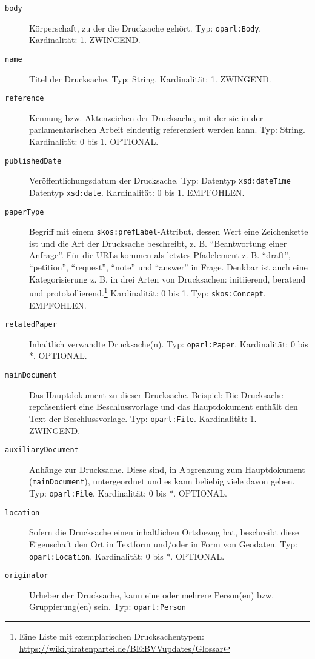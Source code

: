 \documentclass[,a4paper]{article}
\begin{document}
\begin{description}
\item[\texttt{body}]
Körperschaft, zu der die Drucksache gehört. Typ: \texttt{oparl:Body}.
Kardinalität: 1. ZWINGEND.
\item[\texttt{name}]
Titel der Drucksache. Typ: String. Kardinalität: 1. ZWINGEND.
\item[\texttt{reference}]
Kennung bzw. Aktenzeichen der Drucksache, mit der sie in der
parlamentarischen Arbeit eindeutig referenziert werden kann. Typ:
String. Kardinalität: 0 bis 1. OPTIONAL.
\item[\texttt{publishedDate}]
Veröffentlichungsdatum der Drucksache. Typ: Datentyp
\texttt{xsd:dateTime} \textbar{} Datentyp \texttt{xsd:date}.
Kardinalität: 0 bis 1. EMPFOHLEN.
\item[\texttt{paperType}]
Begriff mit einem \texttt{skos:prefLabel}-Attribut, dessen Wert eine
Zeichenkette ist und die Art der Drucksache beschreibt, z. B.
``Beantwortung einer Anfrage''. Für die URLs kommen als letztes
Pfadelement z. B. ``draft'', ``petition'', ``request'', ``note'' und
``answer'' in Frage. Denkbar ist auch eine Kategorisierung z. B. in drei
Arten von Drucksachen: initiierend, beratend und
protokollierend.\footnote{Eine Liste mit exemplarischen
  Drucksachentypen:
  \url{https://wiki.piratenpartei.de/BE:BVVupdates/Glossar}}
Kardinalität: 0 bis 1. Typ: \texttt{skos:Concept}. EMPFOHLEN.
\item[\texttt{relatedPaper}]
Inhaltlich verwandte Drucksache(n). Typ: \texttt{oparl:Paper}.
Kardinalität: 0 bis *. OPTIONAL.
\item[\texttt{mainDocument}]
Das Hauptdokument zu dieser Drucksache. Beispiel: Die Drucksache
repräsentiert eine Beschlussvorlage und das Hauptdokument enthält den
Text der Beschlussvorlage. Typ: \texttt{oparl:File}. Kardinalität: 1.
ZWINGEND.
\item[\texttt{auxiliaryDocument}]
Anhänge zur Drucksache. Diese sind, in Abgrenzung zum Hauptdokument
(\texttt{mainDocument}), untergeordnet und es kann beliebig viele davon
geben. Typ: \texttt{oparl:File}. Kardinalität: 0 bis *. OPTIONAL.
\item[\texttt{location}]
Sofern die Drucksache einen inhaltlichen Ortsbezug hat, beschreibt diese
Eigenschaft den Ort in Textform und/oder in Form von Geodaten. Typ:
\texttt{oparl:Location}. Kardinalität: 0 bis *. OPTIONAL.
\item[\texttt{originator}]
Urheber der Drucksache, kann eine oder mehrere Person(en) bzw.
Gruppierung(en) sein. Typ: \texttt{oparl:Person} \textbar{}

\end{description}
\end{document}
